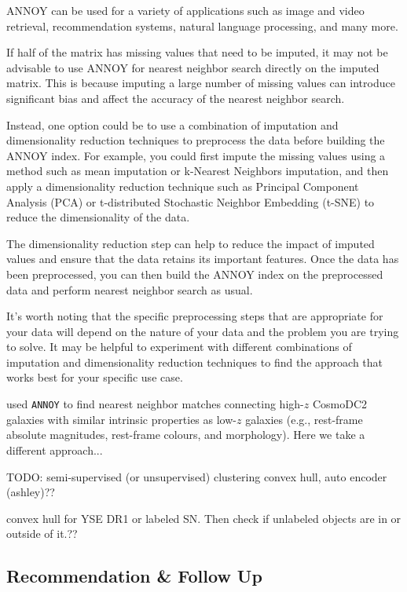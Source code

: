 \documentclass[twocolumn]{aastex63}
\newcommand{\annoy}{\texttt{ANNOY}}
\begin{document}
ANNOY can be used for a variety of applications such as image and video retrieval, recommendation systems, natural language processing, and many more.

If half of the matrix has missing values that need to be imputed, it may not be advisable to use ANNOY for nearest neighbor search directly on the imputed matrix. This is because imputing a large number of missing values can introduce significant bias and affect the accuracy of the nearest neighbor search.

Instead, one option could be to use a combination of imputation and dimensionality reduction techniques to preprocess the data before building the ANNOY index. For example, you could first impute the missing values using a method such as mean imputation or k-Nearest Neighbors imputation, and then apply a dimensionality reduction technique such as Principal Component Analysis (PCA) or t-distributed Stochastic Neighbor Embedding (t-SNE) to reduce the dimensionality of the data.

The dimensionality reduction step can help to reduce the impact of imputed values and ensure that the data retains its important features. Once the data has been preprocessed, you can then build the ANNOY index on the preprocessed data and perform nearest neighbor search as usual.

It's worth noting that the specific preprocessing steps that are appropriate for your data will depend on the nature of your data and the problem you are trying to solve. It may be helpful to experiment with different combinations of imputation and dimensionality reduction techniques to find the approach that works best for your specific use case.

\cite{Lokken2022} used \annoy{} to find nearest neighbor matches connecting high-$z$ CosmoDC2 galaxies with similar intrinsic properties as low-$z$ galaxies (e.g., rest-frame absolute magnitudes, rest-frame colours, and morphology). Here we take a different approach...

TODO: semi-supervised (or unsupervised) clustering convex hull, auto encoder (ashley)??

convex hull for YSE DR1 or labeled SN. Then check if unlabeled objects are in or outside of it.??


\subsection{Recommendation \& Follow Up} \label{subsec:follow_up}
\end{document}
